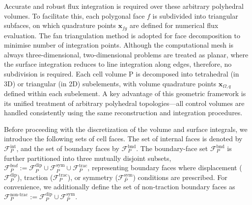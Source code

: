 \documentclass[sn-mathphys,Numbered]{sn-jnl}%
\newcommand{\bb}{\boldsymbol}
\begin{document}
%
Accurate and robust flux integration is required over these arbitrary polyhedral volumes. 
To facilitate this, each polygonal face $f$ is subdivided into triangular subfaces, 
on which quadrature points $\bb{x}_{fg}$ are defined for numerical flux evaluation.
The fan triangulation method is adopted for face decomposition to minimise number of integration points.
Although the computational mesh is always three-dimensional, 
two-dimensional problems are treated as planar, where the surface integration reduces to line integration along edges, 
therefore, no subdivision is required.
Each cell volume P is decomposed into tetrahedral
(in 3D) or triangular (in 2D) subelements, with volume quadrature points $\mathbf{x}_{\Omega,q}$ defined within each subelement.
A key advantage of this geometric framework is its unified treatment of arbitrary polyhedral topologies—all control 
volumes are handled consistently using the same reconstruction and integration procedures. 

Before proceeding with the discretization of the volume and surface integrals, we introduce the following sets of cell faces.
 The set of internal faces is denoted by $\mathcal{F}_P^{\text{int}}$, and the set of boundary faces by $\mathcal{F}_P^{\text{bnd}}$.
The boundary-face set $\mathcal{F}_P^{\text{bnd}}$ is further partitioned into three mutually disjoint subsets,
$\mathcal{F}_P^{bnd} := \mathcal{F}_P^{\text{dip}} \cup \mathcal{F}_P^{\text{sym}} \cup \mathcal{F}_P^{\text{trac}}$,
representing boundary faces where displacement ($\mathcal{F}_P^{\text{dip}}$), traction ($\mathcal{F}_P^{\text{trac}}$),
 or symmetry ($\mathcal{F}_P^{\text{sym}}$) conditions are prescribed. For convenience, we additionally define the set of non-traction boundary faces as $\mathcal{F}_P^{\text{non-trac}} := \mathcal{F}_P^{\text{dip}} \cup \mathcal{F}_P^{\text{sym}}$.
%
\end{document}
